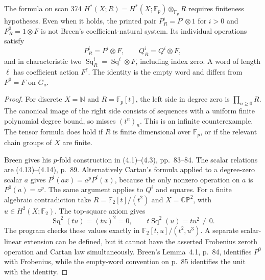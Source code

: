 \begin{proposition}
\label{sa08:D014}
The formula on scan 374
$H^*(X;R)=H^*(X;\mathbb F_p)\otimes_{\mathbb F_p}R$ requires
finiteness hypotheses. Even when it holds, the printed pair
$P_R^i=P^i\otimes1$ for $i>0$ and $P_R^0=1\otimes F$ is not
Breen's coefficient-natural system. Its individual operations satisfy
\[
 P_R^i=P^i\otimes F,\qquad Q_R^i=Q^i\otimes F,
\]
and in characteristic two $\operatorname{Sq}_R^i=
\operatorname{Sq}^i\otimes F$, including index zero. A word of
length $\ell$ has coefficient action $F^\ell$. The identity is the
empty word and differs from $P^0=F$ on $G_a$.
\end{proposition}
\begin{proof}
For discrete $X=\mathbb N$ and $R=\mathbb F_p[t]$, the left side
in degree zero is $\prod_{n\geq0}R$. The canonical image of the
right side consists of sequences with a uniform finite polynomial
degree bound, so misses $(t^n)_n$. This is an infinite counterexample.
The tensor formula does hold if $R$ is finite dimensional over
$\mathbb F_p$, or if the relevant chain groups of $X$ are finite.

Breen gives his $p$-fold construction in (4.1)--(4.3), pp.~83--84.
The scalar relations are (4.13)--(4.14), p.~89. Alternatively
Cartan's formula applied to a degree-zero scalar $a$ gives
$P^i(ax)=a^pP^i(x)$, because the only nonzero operation on $a$
is $P^0(a)=a^p$. The same argument applies to $Q^i$ and squares.
For a finite algebraic contradiction take
$R=\mathbb F_2[t]/(t^2)$ and $X=\mathbb{CP}^2$, with
$u\in H^2(X;\mathbb F_2)$. The top-square axiom gives
\[
 \operatorname{Sq}^2(tu)=(tu)^2=0,
 \qquad t\operatorname{Sq}^2(u)=tu^2\ne0.
\]
The program checks these values exactly in
$\mathbb F_2[t,u]/(t^2,u^3)$. A separate scalar-linear extension
can be defined, but it cannot have the asserted Frobenius zeroth
operation and Cartan law simultaneously. Breen's Lemma~4.1,
p.~84, identifies $P^0$ with Frobenius, while the empty-word
convention on p.~85 identifies the unit with the identity.
\end{proof}


